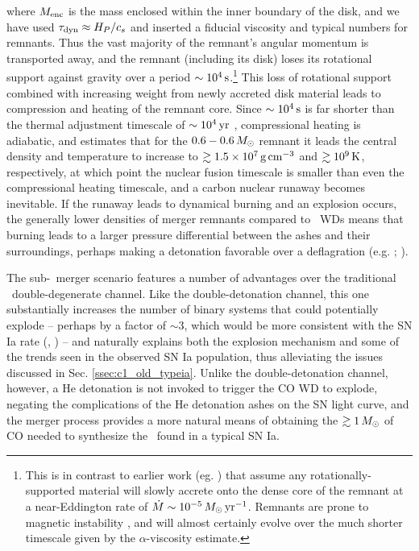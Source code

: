 \noindent where $M_\mathrm{enc}$ is the mass enclosed within the inner boundary of the disk, and we have used $\taudyn \approx H_P/c_s$ and inserted a fiducial viscosity and typical numbers for remnants.  Thus the vast majority of the remnant's angular momentum is transported away, and the remnant (including its disk) loses its rotational support against gravity over a period $\sim10^4\,\mathrm{s}$.\footnote{This is in contrast to earlier work (eg. \citealt{nomoi85, yoonpr07}) that assume any rotationally-supported material will slowly accrete onto the dense core of the remnant at a near-Eddington rate of $\dot{M} \sim 10^{-5}\,\Msun\,\pyr$.  Remnants are prone to magnetic instability \citep{shen+12,ji+13}, and will almost certainly evolve over the much shorter timescale given by the $\alpha$-viscosity estimate.}  This loss of rotational support combined with increasing weight from newly accreted disk material leads to compression and heating of the remnant core.  Since $\sim10^4\,\mathrm{s}$ is far shorter than the thermal adjustment timescale of $\sim10^4\,\mathrm{yr}$ \citep{shen+12}, compressional heating is adiabatic, and \citeal{vkercj10} estimates that for the $0.6-0.6\,\Msun$ remnant it leads the central density and temperature to increase to $\gtrsim1.5\times10^7\,\gcc$ and $\gtrsim10^9\,\mathrm{K}$, respectively, at which point the nuclear fusion timescale is smaller than even the compressional heating timescale, and a carbon nuclear runaway becomes inevitable.  If the runaway leads to dynamical burning and an explosion occurs, the generally lower densities of merger remnants compared to \Mch\ WDs means that burning leads to a larger pressure differential between the ashes and their surroundings, perhaps making a detonation favorable over a deflagration (e.g. \citealt{mazumw77}; \citealt{seit+09}).

The sub-\Mch\ merger scenario features a number of advantages over the traditional \Mch\ double-degenerate channel.  Like the double-detonation channel, this one substantially increases the number of binary systems that could potentially explode -- perhaps by a factor of $\sim3$, which would be more consistent with the SN Ia rate (\citeal{vkercj10}, \citealt{badem12}) -- and naturally explains both the explosion mechanism and some of the trends seen in the observed SN Ia population, thus alleviating the issues discussed in Sec. \ref{ssec:c1_old_typeia}.  Unlike the double-detonation channel, however, a He detonation is not invoked to trigger the CO WD to explode, negating the complications of the He detonation ashes on the SN light curve, and the merger process provides a more natural means of obtaining the $\gtrsim1\,\Msun$ of CO needed to synthesize the \Ni\ found in a typical SN Ia.

